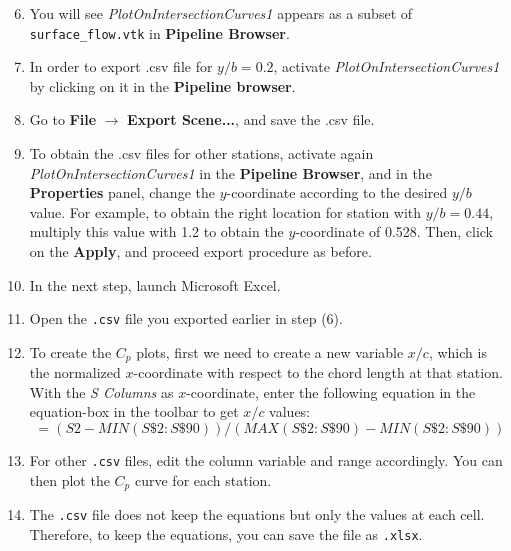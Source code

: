 \begin{enumerate}[label=\arabic*)]
	\setcounter{enumi}{5}
	\item You will see \textit{PlotOnIntersectionCurves1} appears as a subset of \texttt{surface\_flow.vtk} in \textbf{Pipeline Browser}.
	\item In order to export .csv file for $y/b=0.2$, activate \textit{PlotOnIntersectionCurves1} by clicking on it in the \textbf{Pipeline browser}.
	\item Go to \textbf{File} $\rightarrow$ \textbf{Export Scene...}, and save the .csv file.
	\item To obtain the .csv files for other stations, activate again \textit{PlotOnIntersectionCurves1} in the \textbf{Pipeline Browser}, and in the \textbf{Properties} panel, change the $y$-coordinate according to the desired $y/b$ value. For example, to obtain the right location for station with $y/b=0.44$, multiply this value with 1.2 to obtain the $y$-coordinate of 0.528. Then, click on the \textbf{Apply}, and proceed export procedure as before.
	\item In the next step, launch Microsoft Excel.
	\item Open the \texttt{.csv} file you exported earlier in step (6).
	\item To create the $C_p$ plots, first we need to create a new variable $x/c$, which is the normalized $x$-coordinate with respect to the chord length at that station. With the \textit{S Columns} as $x$-coordinate, enter the following equation in the equation-box in the toolbar to get $x/c$ values:
	\begin{equation}
		=(S2-MIN(S\$2:S\$90))/(MAX(S\$2:S\$90)-MIN(S\$2:S\$90))
	\end{equation}
	\item For other \texttt{.csv} files, edit the column variable and range accordingly. You can then plot the $C_p$ curve for each station.
	\item The \texttt{.csv} file does not keep the equations but only the values at each cell. Therefore, to keep the equations, you can save the file as \texttt{.xlsx}.
\end{enumerate}
